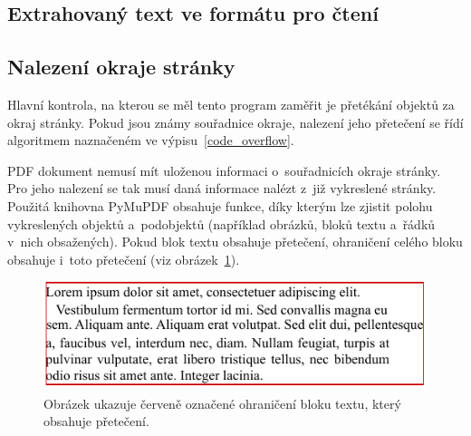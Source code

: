 \noindent\begin{minipage}{\linewidth}
    \hfill
    
\end{minipage}



\subsection*{Extrahovaný text ve formátu pro čtení}


\subsection*{Nalezení okraje stránky}
Hlavní kontrola, na kterou se měl tento program zaměřit je přetékání objektů za
okraj stránky. Pokud jsou známy souřadnice okraje, nalezení jeho přetečení
se řídí algoritmem naznačeném ve výpisu~\ref{code_overflow}.

\noindent\begin{minipage}{\linewidth}
    \hfill
    
\end{minipage}

PDF dokument nemusí mít uloženou informaci o~souřadnicích okraje stránky. Pro
jeho nalezení se tak musí daná informace nalézt z~již vykreslené stránky.
Použitá knihovna PyMuPDF obsahuje funkce, díky kterým lze zjistit polohu
vykreslených objektů a~podobjektů (například obrázků, bloků textu a~řádků v~nich
obsažených). Pokud blok textu obsahuje přetečení, ohraničení celého bloku
obsahuje i~toto přetečení (viz obrázek~\ref{pic_block_bbox}).

\begin{figure}[H]
    \centering
    \includegraphics[width=0.7\linewidth]{obrazky-figures/block_bbox.pdf}
    \caption{Obrázek ukazuje červeně označené ohraničení bloku textu, který obsahuje přetečení.}
    \label{pic_block_bbox}
\end{figure}

